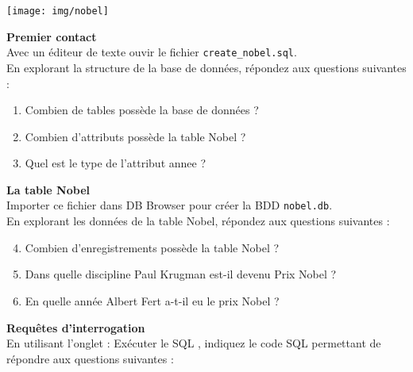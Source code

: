 \documentclass[a4paper,12pt,french]{book}
\begin{document}


\begin{exercice}
\begin{center}
	\texttt{[image: img/nobel]}
\end{center}
\textbf{Premier contact}\\

Avec un éditeur de texte ouvir le fichier \texttt{create\_nobel.sql}.\\
En explorant la structure de la base de données, répondez aux questions suivantes :	\\
\begin{enumerate}[\bfseries 1.]
	\item 	Combien de tables possède la base de données ?
	\item 	Combien d’attributs possède la table Nobel ?
	\item 	Quel est le type de l’attribut annee ?\\
\end{enumerate}
\textbf{La table Nobel}\\

Importer ce fichier dans DB Browser pour créer la BDD \texttt{nobel.db}.\\
En explorant les données de la table Nobel, répondez aux questions suivantes :\\

\begin{enumerate}[\bfseries 1.]
	\setcounter{enumi}{3}
	\item 	Combien d’enregistrements possède la table Nobel ?
	\item 	Dans quelle discipline Paul Krugman est-il devenu Prix Nobel ?
	\item 	En quelle année Albert Fert a-t-il eu le prix Nobel ?	\\
\end{enumerate}
\newpage
\textbf{Requêtes d'interrogation}\\

En utilisant l’onglet : \og Exécuter le SQL \fg, indiquez le code SQL permettant de répondre aux questions suivantes :\\


\end{exercice}
\end{document}
